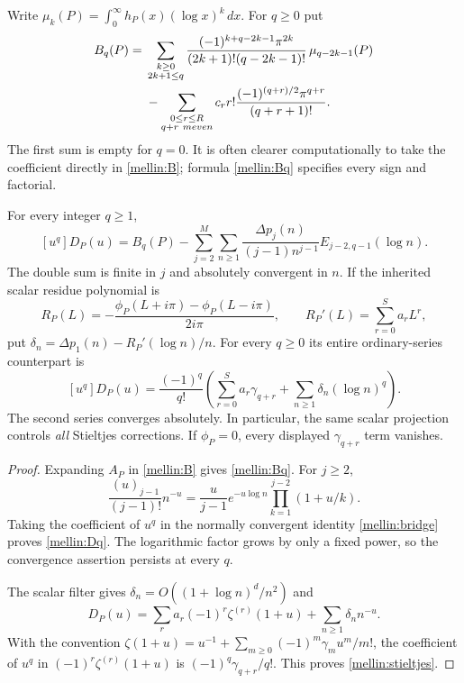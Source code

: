 Write $\mu_k(P)=\int_0^\infty h_P(x)(\log x)^k\,dx$.
For $q\ge0$ put
\begin{align}
 B_q(P)={}&
 \sum_{\substack{k\ge0\\2k+1\le q}}
 \frac{(-1)^{k+q-2k-1}\pi^{2k}}
 {(2k+1)!(q-2k-1)!}\,\mu_{q-2k-1}(P)\notag\\
 &-\sum_{\substack{0\le r\le R\\q+r\ {
m even}}}
 c_r r!\frac{(-1)^{(q+r)/2}\pi^{q+r}}{(q+r+1)!}.
 \label{mellin:Bq}
\end{align}
The first sum is empty for $q=0$.  It is often clearer computationally
to take the coefficient directly in \eqref{mellin:B}; formula
\eqref{mellin:Bq} specifies every sign and factorial.

\begin{corollary}
\label{mellin:coefficients}
For every integer $q\ge1$,
\begin{equation}\label{mellin:Dq}
 \boxed{[u^q]D_P(u)=B_q(P)-
 \sum_{j=2}^{M}\sum_{n\ge1}
 \frac{\Delta p_j(n)}{(j-1)n^{j-1}}
 E_{j-2,q-1}(\log n).}
\end{equation}
The double sum is finite in $j$ and absolutely convergent in $n$.
If the inherited scalar residue polynomial is
\[
 R_P(L)=-\frac{\phi_P(L+i\pi)-\phi_P(L-i\pi)}{2i\pi},
 \qquad R_P'(L)=\sum_{r=0}^{S}a_rL^r,
\]
put
$\delta_n=\Delta p_1(n)-R_P'(\log n)/n$.
For every $q\ge0$ its entire ordinary-series counterpart is
\begin{equation}\label{mellin:stieltjes}
 \boxed{[u^q]D_P(u)=\frac{(-1)^q}{q!}
 \left(\sum_{r=0}^{S}a_r\gamma_{q+r}
                  +\sum_{n\ge1}\delta_n(\log n)^q\right).}
\end{equation}
The second series converges absolutely.  In particular, the same
scalar projection controls \emph{all} Stieltjes corrections.  If
$\phi_P=0$, every displayed $\gamma_{q+r}$ term vanishes.
\end{corollary}

\begin{proof}
Expanding $A_P$ in \eqref{mellin:B} gives \eqref{mellin:Bq}.
For $j\ge2$,
\[
 \frac{(u)_{j-1}}{(j-1)!}n^{-u}
 =\frac{u}{j-1}e^{-u\log n}\prod_{k=1}^{j-2}(1+u/k).
\]
Taking the coefficient of $u^q$ in the normally convergent identity
\eqref{mellin:bridge} proves \eqref{mellin:Dq}.  The logarithmic
factor grows by only a fixed power, so the convergence assertion
persists at every $q$.

The scalar filter gives
$\delta_n=O((1+\log n)^d/n^2)$ and
\[
 D_P(u)=\sum_r a_r(-1)^r\zeta^{(r)}(1+u)
                         +\sum_{n\ge1}\delta_nn^{-u}.
\]
With the convention
$\zeta(1+u)=u^{-1}+\sum_{m\ge0}(-1)^m\gamma_m u^m/m!$,
the coefficient of $u^q$ in
$(-1)^r\zeta^{(r)}(1+u)$ is
$(-1)^q\gamma_{q+r}/q!$.  This proves \eqref{mellin:stieltjes}.
\end{proof}

